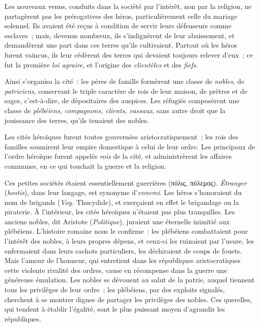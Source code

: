 \documentclass[french,twoside]{book} %
\begin{document}
Les nouveaux venus, conduits dans la société par l’intérêt, non par la religion, ne partagèrent pas les prérogatives des héros, particulièrement celle du mariage solennel. Ils avaient été reçus à condition  de servir leurs défenseurs comme esclaves ; mais, devenus nombreux, ils s’indignèrent de leur abaissement, et demandèrent une part dans ces terres qu’ils cultivaient. Partout où les héros furent vaincus, ils leur cédèrent des terres qui devaient toujours relever d’eux ; ce fut la première {\itshape loi agraire}, et l’origine des {\itshape clientèles} et des {\itshape fiefs}.\par
Ainsi s’organisa la cité : les pères de famille formèrent une classe de {\itshape nobles}, de {\itshape patriciens}, conservant le triple caractère de rois de leur maison, de prêtres et de sages, c’est-à-dire, de dépositaires des auspices. Les réfugiés composèrent une classe de {\itshape plébéiens, compagnons, clients, vassaux}, sans autre droit que la jouissance des terres, qu’ils tenaient des nobles.\par
Les cités héroïques furent toutes gouvernées aristocratiquement ; les rois des familles soumirent leur empire domestique à celui de leur ordre. Les principaux de l’ordre héroïque furent appelés {\itshape rois} de la cité, et administrèrent les affaires communes, en ce qui touchait la guerre et la religion.\par
Ces petites sociétés étaient essentiellement guerrières (πόλις, πόλεμος). {\itshape Étranger} ({\itshape hostis}), dans leur langage, est synonyme d’{\itshape ennemi}. Les héros s’honoraient du nom de brigands ({\itshape Voy.} Thucydide), et exerçaient en effet le brigandage ou la piraterie. À l’intérieur, les cités héroïques n’étaient pas plus  tranquilles. Les anciens nobles, dit Aristote ({\itshape Politique}), juraient une éternelle inimitié aux plébéiens. L’histoire romaine nous le confirme : les plébéiens combattaient pour l’intérêt des nobles, à leurs propres dépens, et ceux-ci les ruinaient par l’usure, les enfermaient dans leurs cachots particuliers, les déchiraient de coups de fouets. Mais l’amour de l’honneur, qui entretient dans les républiques aristocratiques cette violente rivalité des ordres, cause en récompense dans la guerre une généreuse émulation. Les nobles se dévouent au salut de la patrie, auquel tiennent tous les privilèges de leur ordre ; les plébéiens, par des exploits signalés, cherchent à se montrer dignes de partager les privilèges des nobles. Ces querelles, qui tendent à établir l’égalité, sont le plus puissant moyen d’agrandir les républiques.\par
\end{document}
